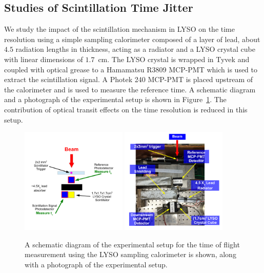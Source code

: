 \documentclass[12pt]{article}
\begin{document}
\subsection{Studies of Scintillation Time Jitter}

We study the impact of the scintillation mechanism in LYSO
on the time resolution using a simple 
sampling calorimeter composed of a layer of
lead, about $4.5$ radiation lengths in thickness, acting
as a radiator and a LYSO crystal cube with linear dimensions 
of $1.7$~cm. The LYSO crystal is wrapped in Tyvek and  
coupled with optical grease to a Hamamatsu R3809 MCP-PMT
which is used to extract the scintillation signal. 
A Photek 240 MCP-PMT is placed upstream of the calorimeter and 
is used to measure the reference time. A schematic diagram
and a photograph of the experimental setup
is shown in Figure~\ref{fig:LYSOSamplingCaloSetup}. 
The contribution of optical transit effects on the 
time resolution is reduced in this setup.

\begin{figure}[h] \centering
\includegraphics[width=0.45\textwidth]{figs/LYSOSamplingCaloSetupSchematic} 
\includegraphics[width=0.45\textwidth]{figs/LYSOSamplingCaloSetupPhoto} 
\caption{ A schematic diagram of the experimental setup for the
time of flight measurement using the LYSO sampling calorimeter
is shown, along with a photograph of the experimental setup. } 
\label{fig:LYSOSamplingCaloSetup}
\end{figure}
\end{document}
